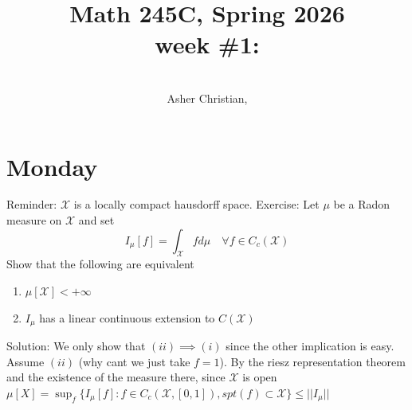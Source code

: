 \documentclass[11pt]{article}
\newcommand{\cnum}{Math 245C}
\newcommand{\ced}{Spring 2026}
\newcommand{\ctitle}[4]{\title{\vspace{-0.5in}\cnum, \ced\\week #1: #2}\author{\vspace{-0.35in}\\#3, #4}}
\begin{document}
\ctitle{\#1}{}{Asher Christian}{}
\date{}
\maketitle

\section{Monday}
Reminder: $ \mathcal{X}$ is a locally compact hausdorff space.
Exercise:
Let  $\mu$ be a Radon measure on $ \mathcal{X}$ and set
\[
    I_\mu[f] = \int_{ \mathcal{X}}^{} f d\mu \quad \forall f \in C_c( \mathcal{X})
\] 
Show that the following are equivalent
\begin{enumerate}
    \item $\mu[ \mathcal{X}] < +\infty$
    \item $I_\mu$ has a linear continuous extension to $C( \mathcal{X})$
\end{enumerate}
Solution: We only show that $(ii) \implies (i)$ since the other implication is easy.
Assume  $(ii)$ (why cant we just take $f = 1$).
By the riesz representation theorem and the existence of the measure there, since $ \mathcal{X}$ is open
$\mu[X] = \sup_{f} \{I_\mu[f] : f \in C_c( \mathcal{X}, [0,1]), spt(f) \subset \mathcal{X}\}  \le ||I_\mu||$
\end{document}
